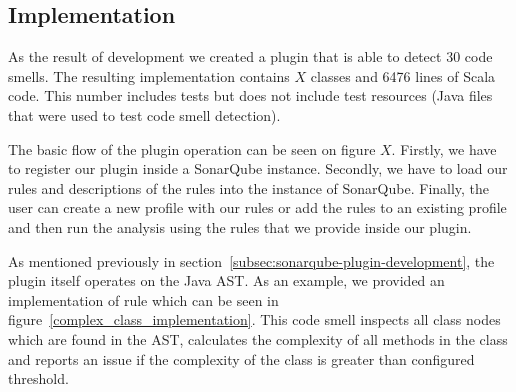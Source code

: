 
\subsection{Implementation}\label{subsec:implementation}



As the result of development we created a plugin that is able to detect 30 code smells.
The resulting implementation contains $X$ classes and 6476 lines of Scala code.
This number includes tests but does not include test resources (Java files that were
used to test code smell detection).


The basic flow of the plugin operation can be seen on figure $X$.
Firstly, we have to register our plugin inside a SonarQube instance.
Secondly, we have to load our rules and descriptions of the rules into the instance of SonarQube.
Finally, the user can create a new profile with our rules or add the rules to an existing
profile and then run the analysis using the rules that we provide inside our plugin.

As mentioned previously in section~\ref{subsec:sonarqube-plugin-development}, the plugin itself operates on the Java
AST\@.
As an example, we provided an implementation of  rule which can be seen in figure~\ref{complex_class_implementation}.
This code smell inspects all class nodes which are found in the AST, calculates the complexity of all methods
in the class and reports an issue if the complexity of the class is greater than configured threshold.

